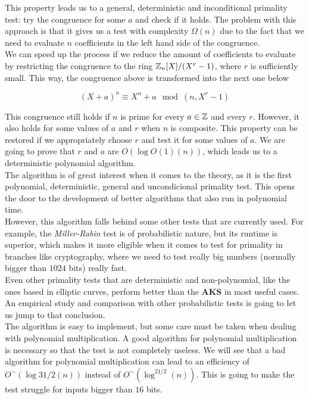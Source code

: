 This property leads us to a general, deterministic and inconditional primality test: try the congruence for some $a$ and check if it holds. The problem with this approach is that it gives us a test with complexity $\Omega(n)$ due to the fact that we need to evaluate $n$ coefficients in the left hand side of the congruence.\\

We can speed up the process if we reduce the amount of coefficients to evaluate by restricting the congruence to the ring $\mathbb{Z}_n[X]/(X^r - 1)$, where $r$ is sufficiently small. This way, the congruence above is transformed into the next one below

\begin{equation}
(X + a)^n \equiv X^n + a \mod(n, X^r - 1)
\end{equation}

This congruence still holds if $n$ is prime for every $a \in \mathbb{Z}$ and every $r$. However, it also holds for some values of $a$ and $r$ when $n$ is composite. This property can be restored if we appropriately choose $r$ and test it for some values of $a$. We are going to prove that $r$ and $a$ are $O(\log{O(1)}(n))$, which leads us to a deterministic polynomial algorithm.\\

The algorithm is of great interest when it comes to the theory, as it is the first polynomial, deterministic, general and uncondicional primality test. This opens the door to the development of better algorithms that also run in polynomial time.\\

However, this algorithm falls behind some other tests that are currently used. For example, the \textit{Miller-Rabin} test is of probabilistic nature, but its runtime is superior, which makes it more eligible when it comes to test for primality in branches like cryptography, where we need to test really big numbers (normally bigger than $1024$ bits) really fast.\\

Even other primality tests that are deterministic and non-polynomial, like the ones based in elliptic curves, perform better than the \textbf{AKS} in most useful cases.\\

An empirical study and comparison with other probabilistic tests is going to let us jump to that conclusion.\\

The algorithm is easy to implement, but some care must be taken when dealing with polynomial multiplication. A good algorithm for polynomial multiplication is necessary so that the test is not completely useless. We will see that a bad algorithm for polynomial multiplication can lead to an efficiency of $O^\sim(\log{31/2}(n))$ instead of $O^\sim(\log^{21/2}(n))$. This is going to make the test struggle for inputs bigger than $16$ bits.\\

